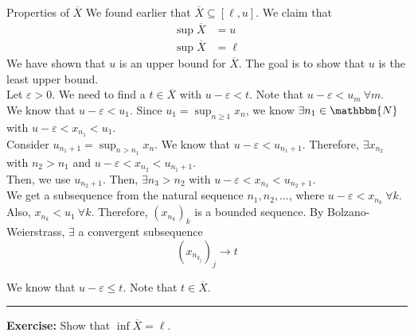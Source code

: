 \documentclass[10pt]{extarticle}
\newcommand{\N}{\mathbbm{N}}
\begin{document}
  \begin{problem}{Properties of $\overline{X}$}
    We found earlier that $\overline{X} \subseteq [\ell,u]$. We claim that
    \begin{align*}
      \sup \overline{X} &= u\\
      \sup\overline{X} &= \ell
    \end{align*}
    \tcblower
    We have shown that $u$ is an upper bound for $\overline{X}$. The goal is to show that $u$ is the least upper bound.\\

    Let $\varepsilon > 0$. We need to find a $t\in\overline{X}$ with $u-\varepsilon < t$. Note that $u-\varepsilon < u_m~\forall m$.\\

    We know that $u-\varepsilon < u_1$. Since $u_1 = \sup_{n\geq 1}x_n$, we know $\exists n_1\in\N$ with $u-\varepsilon < x_{n_1} < u_1$.\\

    Consider $u_{n_1+1} = \sup_{n > n_1}x_n$. We know that $u-\varepsilon < u_{n_1 + 1}$. Therefore, $\exists x_{n_2}$ with $n_2 > n_1$ and $u-\varepsilon < x_{n_2} < u_{n_1 + 1}$.\\

    Then, we use $u_{n_2 + 1}$. Then, $\exists n_3 > n_2$ with $u-\varepsilon < x_{n_3} < u_{n_2 + 1}$.\\

    We get a subsequence from the natural sequence $n_1,n_2,\dots$, where $u - \varepsilon < x_{n_k}~\forall k$.\\

    Also, $x_{n_k} < u_1~\forall k$. Therefore, $(x_{n_k})_k$ is a bounded sequence. By Bolzano-Weierstrass, $\exists$ a convergent subsequence \[\left(x_{n_{k_j}}\right)_j \rightarrow t\]

    We know that $u-\varepsilon \leq t$. Note that $t\in\overline{X}$.\\
    \vspace{4pt}
    \rule{\textwidth}{0.4pt}
    \vspace{4pt}
    \textbf{Exercise:} Show that $\inf\overline{X} = \ell$.
  \end{problem}
\end{document}
